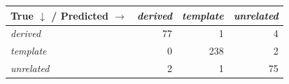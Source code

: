 \begin{tabular}{lrrr}
\toprule
True $\downarrow$ / Predicted $\rightarrow$ & \textit{derived} & \textit{template} & \textit{unrelated} \\
\midrule
\textit{derived} & 77 & 1 & 4 \\
\textit{template} & 0 & 238 & 2 \\
\textit{unrelated} & 2 & 1 & 75 \\
\bottomrule
\end{tabular}
